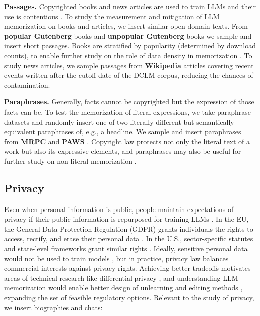 \textbf{Passages.} Copyrighted books and news articles are used to train LLMs and their use is contentious \citep{chang-etal-2023-speak,cooper2025extracting}. To study the measurement \citep[e.g.][]{ schwarzchild_rethinking_2024, hayes-etal-2025-measuring} and mitigation \citep[e.g.][]{ippolito-etal-2023-preventing, wei_evaluating_2024} of LLM memorization on books and articles, we insert similar open-domain texts. From \textbf{popular Gutenberg} books and \textbf{unpopular Gutenberg} books \citep{gerlach2018standardizedprojectgutenbergcorpus} we sample and insert short passages. Books are stratified by popularity (determined by download counts), to enable further study on the role of data density in memorization \citep{wang2025generalization, kirchenbauer2024lmd}. To study news articles, we sample passages from \textbf{Wikipedia} articles covering recent events written after the cutoff date of the \textsc{DCLM} corpus, reducing the chances of contamination.

\textbf{Paraphrases.} Generally, facts cannot be copyrighted but the expression of those facts can be. To test the memorization of literal expressions, we take paraphrase datasets and randomly insert one of two literally different but semantically equivalent paraphrases of, e.g., a headline. We sample and insert paraphrases from \textbf{MRPC} and \textbf{PAWS} \citep{dolan2005automatically, zhang-etal-2019-paws}. Copyright law protects not only the literal text of a work but also its expressive elements, and paraphrases may also be useful for further study on non-literal memorization \citep{chen-etal-2024-copybench,roh2025bobsconfettiphoneticmemorization}. 

\subsection{Privacy}

Even when personal information is public, people maintain expectations of privacy if their public information is repurposed for training LLMs \citep{DBLP:conf/fat/BrownLMST22}. In the EU, the General Data Protection Regulation (GDPR) grants individuals the rights to access, rectify, and erase their personal data \citep{gdpr2016}. In the U.S., sector-specific statutes and state-level frameworks grant similar rights \citep[e.g., the California Consumer Privacy Act,][]{ccpa2018}. 
Ideally, sensitive personal data would not be used to train models \citep{hong2025commonpoolprivacyproblems}, but in practice, privacy law balances commercial interests against privacy rights. Achieving better tradeoffs motivates areas of technical research like differential privacy \citep{NIST800226}, and understanding LLM memorization would enable better design of unlearning and editing methods \citep{bourtoule_2021_machine, meng2022locating}, expanding the set of feasible regulatory options. Relevant to the study of privacy, we insert biographies and chats:

